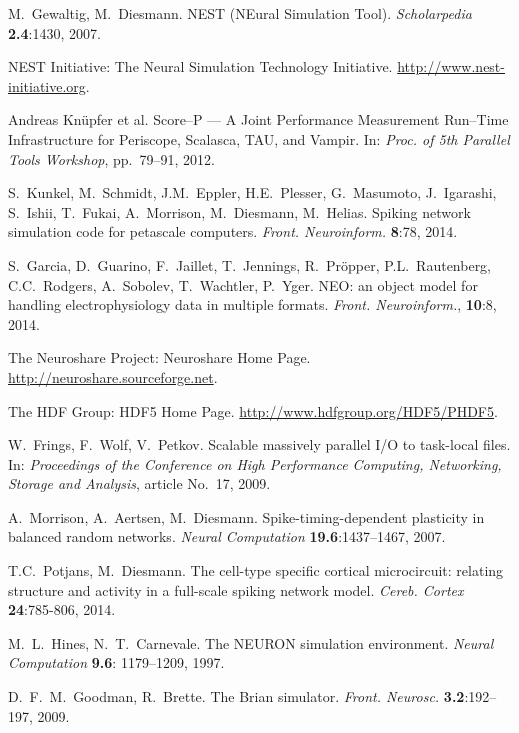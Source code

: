\documentclass[]{YIC2015}
\begin{document}
\begin{thebibliography}{99}

  M.~Gewaltig, M.~Diesmann. NEST (NEural Simulation
  Tool). \textit{Scholarpedia} %
  \textbf{2.4}:1430, 2007.

 NEST Initiative: The Neural Simulation
  Technology Initiative. \url{http://www.nest-initiative.org}.

 Andreas Kn\"upfer et al. Score--P --- A Joint
  Performance Measurement Run--Time Infrastructure for Periscope,
  Scalasca, TAU, and Vampir. In: \textit{Proc. of 5th Parallel Tools
    Workshop}, pp.~79--91, 2012.

 S.~Kunkel, M.~Schmidt, J.M.~Eppler, H.E.~Plesser,
  G.~Masumoto, J.~Igarashi, S.~Ishii, T.~Fukai, A.~Morrison,
  M.~Diesmann, M.~Helias.  Spiking network simulation code for
  petascale computers.  \textit{Front. Neuroinform.} \textbf{8}:78,
  2014.

 S.~Garcia, D.~Guarino, F.~Jaillet, T.~Jennings,
  R.~Pr{\"o}pper, P.L.~Rautenberg, C.C.~Rodgers, A.~Sobolev,
  T.~Wachtler, P.~Yger. NEO: an object model for handling
  electrophysiology data in multiple formats.
  \textit{Front. Neuroinform.}, \textbf{10}:8, 2014.

 The Neuroshare Project: Neuroshare Home
  Page. \url{http://neuroshare.sourceforge.net}.

 The HDF Group: HDF5 Home
  Page. \url{http://www.hdfgroup.org/HDF5/PHDF5}.

 W.~Frings, F.~Wolf, V.~Petkov. Scalable
  massively parallel I/O to task-local files.  In: \textit{Proceedings
    of the Conference on High Performance Computing, Networking,
    Storage and Analysis}, article No.~17, 2009.

 A.~Morrison, A.~Aertsen,
  M.~Diesmann. Spike-timing-dependent plasticity in balanced random
  networks. \textit{Neural Computation} \textbf{19.6}:1437--1467,
  2007.

 T.C.~Potjans, M.~Diesmann. The cell-type specific
  cortical microcircuit: relating structure and activity in a
  full-scale spiking network model. \textit{Cereb. Cortex}
  \textbf{24}:785-806, 2014.

 M.~L.~Hines, N.~T.~Carnevale. The NEURON simulation
  environment. \textit{Neural Computation} \textbf{9.6}: 1179--1209,
  1997.

 D.~F.~M.~Goodman, R.~Brette. The Brian
  simulator. \textit{Front. Neurosc.} \textbf{3.2}:192--197, 2009.

\end{thebibliography}
\end{document}
